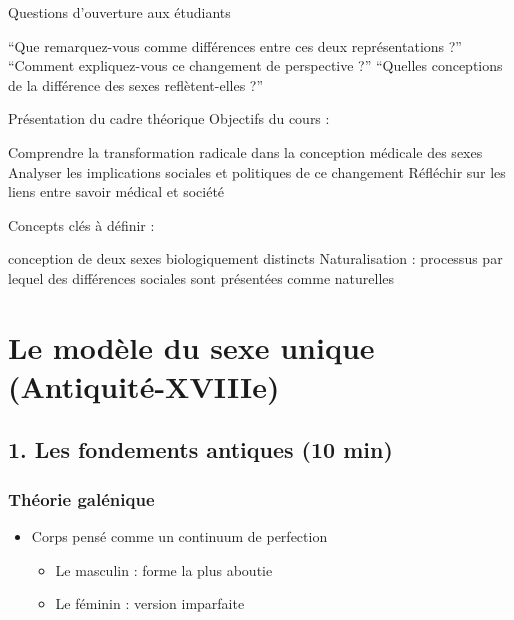 \documentclass[
  letterpaper,
  DIV=11,
  numbers=noendperiod]{scrreprt}
\providecommand{\tightlist}{%
  \setlength{\itemsep}{0pt}\setlength{\parskip}{0pt}}\usepackage{longtable,booktabs,array}
\begin{document}
Questions d'ouverture aux étudiants

``Que remarquez-vous comme différences entre ces deux représentations
?'' ``Comment expliquez-vous ce changement de perspective ?'' ``Quelles
conceptions de la différence des sexes reflètent-elles ?''

Présentation du cadre théorique Objectifs du cours :

Comprendre la transformation radicale dans la conception médicale des
sexes Analyser les implications sociales et politiques de ce changement
Réfléchir sur les liens entre savoir médical et société

Concepts clés à définir :

\begin{description}
\tightlist
\item[Épistémologie : étude de la construction des savoirs Dimorphisme
sexuel]
conception de deux sexes biologiquement distincts Naturalisation :
processus par lequel des différences sociales sont présentées comme
naturelles
\end{description}


\chapter{}\label{section-1}


\chapter{Le modèle du sexe unique
(Antiquité-XVIIIe)}\label{le-moduxe8le-du-sexe-unique-antiquituxe9-xviiie}

\section{1. Les fondements antiques (10
min)}\label{les-fondements-antiques-10-min}

\subsection{Théorie galénique}\label{thuxe9orie-galuxe9nique}

\begin{itemize}
\tightlist
\item
  Corps pensé comme un continuum de perfection

  \begin{itemize}
  \tightlist
  \item
    Le masculin : forme la plus aboutie
  \item
    Le féminin : version imparfaite
  \end{itemize}
\end{itemize}
\end{document}
